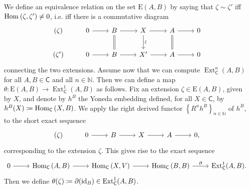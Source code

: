 \begin{rem}[]\label{rem:YonedaExensionTheta}
	We define an equivalence relation on the set $\mathrm{E}(A,B)$ by
	saying that $\zeta \sim \zeta'$ 
	iff $\operatorname{Hom}_{  } \left( \zeta, \zeta' \right) \neq 0$,
	i.e. iff there is a commutative diagram
	\begin{equation*}
	\begin{tikzcd}
		(\zeta) &
		0 \arrow[r, "", rightarrow] &
		B \arrow[r, "", rightarrow] 
		\arrow[d, "", equals] &
		X \arrow[r, "", rightarrow] 
		\arrow[d, "\rotatebox{90}{\(\sim\)}", rightarrow] &
		A \arrow[r, "", rightarrow] 
		\arrow[d, "", equals] &
		0\\
		(\zeta') &
		0 \arrow[r, "", rightarrow] &
		B \arrow[r, "", rightarrow] &
		X' \arrow[r, "", rightarrow] &
		A \arrow[r, "", rightarrow] &
		0
	\end{tikzcd}
	\end{equation*}
	connecting the two extensions.
	Assume now that we can compute $\operatorname{Ext}^n_{\mathsf{C}}(A, B)$
	for all $A,B \in \mathsf{C}$ and all $n \in \mathbb{N}$.
	Then we can define a map $\theta\colon \mathrm{E}(A,B) \to 
	\operatorname{Ext}^1_{\mathsf{C}}(A,B)$ as follows.
	Fix an extension $\zeta \in \mathrm{E}(A,B)$, given by $X$,
	and denote by $h^B$ the Yoneda
	embedding defined, for all $X \in \mathsf{C}$, by
	$h^B(X) \coloneqq \operatorname{Hom}_{\mathsf{C}} \left( X, B \right)$.
	We apply the right derived functor 
	$\left\{ R^n h^B \right\}_{n \in \mathbb{N}}$ of $h^B$, 
	to the short exact sequence
	\begin{equation*}
	\begin{tikzcd}
		(\zeta) &
		0 \arrow[r, "", rightarrow] &
		B \arrow[r, "", rightarrow] &
		X \arrow[r, "", rightarrow] &
		A \arrow[r, "", rightarrow] &
		0
	,\end{tikzcd}
	\end{equation*}
	corresponding to the extension $\zeta$.
	This gives rise to the exact sequence
	\begin{equation*}
	\begin{tikzcd}
		0 \arrow[r, "", rightarrow] &
		\Hom_{\mathsf{C}} \left( A, B \right) \arrow[r, "", rightarrow] &
		\Hom_{\mathsf{C}} \left( X, V \right) \arrow[r, "", rightarrow] &
		\Hom_{\mathsf{C}} \left( B, B \right) \arrow[r, "\partial", rightarrow] &
		\operatorname{Ext}^1_{\mathsf{C}}(A,B)
	.\end{tikzcd}
	\end{equation*}
	Then we define $\theta(\zeta) \coloneqq \partial(\operatorname{id}_{ B }) \in \operatorname{Ext}^1_{\mathsf{C}}
	(A,B)$.
\end{rem}


